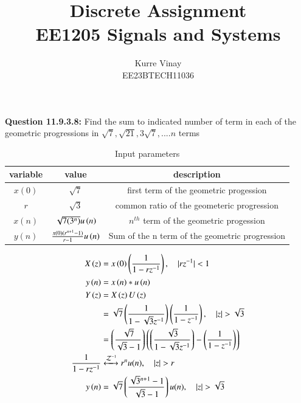 \documentclass[a4,12pt,onecolumn]{IEEEtran}
\begin{document}
\title{
\Huge\textbf{Discrete Assignment}\\
\Huge\textbf{EE1205} Signals and Systems\\
}
\large\author{Kurre Vinay\\EE23BTECH11036}
\maketitle
\textbf{Question 11.9.3.8:}
Find the sum to indicated number of term in each of the geometric progressions in $\sqrt{7} ,\sqrt{21} , 3\sqrt{7}, ....n$ terms\\
\solution
\fi
\begin{table}[h!]
 \begin{center}
\begin{tabular}{|c|c|c|}
   \hline
   variable&value&description  \\
   \hline
   $x(0)$ & $ \sqrt{7} $& first term of the geometric progession\\
   \hline
   $r$ & $\sqrt{3}$ & common ratio of the geometeric progression\\
   \hline
   $x(n)$ & $\sqrt{7(3^{n})}u\left(n\right)$& $n^{th}$ term of the geometric progession\\
   \hline
   $y(n)$ &$\frac{x(0)(r^{n+1}-1)}{r-1}u\left(n\right)$ &Sum of the n term of the geometric progression\\
   \hline 
\end{tabular}
\caption{Input parameters}
\end{center}
\end{table}

\begin{align}
X\brak{z} &= x\brak{0}\brak{\frac{1}{1-rz^{-1}}}, \quad{|rz^{-1}|<1}\\
y\brak{n} &= x\brak{n}*u\brak{n}\\
Y\brak{z} &= X\brak{z}U\brak{z}\\
&=\sqrt{7}\brak{\frac{1}{1-\sqrt{3}z^{-1}}}\brak{\frac{1}{1-z^{-1}}} ,\quad{|z|>\sqrt{3}}\\
&=\brak{\frac{\sqrt{7}}{\sqrt{3}-1}}\brak{\brak{\frac{\sqrt{3}}{1-\sqrt{3}z^{-1}}}-\brak{\frac{1}{1-z^{-1}}}}\\
\frac{1}{1-rz^{-1}} &\xleftrightarrow{\mathcal{Z}^{-1}}  r^nu(n), \quad{|z|>r}\\
y\brak{n} &= \sqrt{7}\brak{\frac{\sqrt{3}^{n+1}-1}{\sqrt{3}-1}}u(n) , \quad{|z|>\sqrt{3}}
\end{align}
\end{document}
